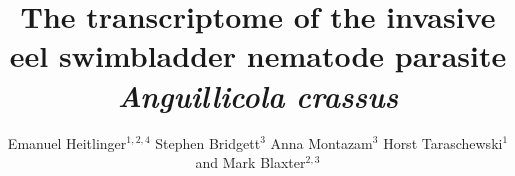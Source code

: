 \documentclass[10pt]{bmc_article}
\newenvironment{bmcformat}{\begin{raggedright}\baselineskip20pt\sloppy\setboolean{publ}{false}}{\end{raggedright}\baselineskip20pt\sloppy}
\begin{document}
\begin{bmcformat}


  \title{The transcriptome of the invasive eel swimbladder nematode
    parasite \textit{Anguillicola crassus}}
 


\author{Emanuel Heitlinger\correspondingauthor$^{1,2,4}$%
       Stephen Bridgett$^{3}$%
       Anna Montazam$^{3}$%
       Horst Taraschewski$^1$%
       and Mark Blaxter$^{2,3}$%
     }%
      


      \address{%
        \iid(1)Department of Ecology and Parasitology, Zoological
        Institute, Karlsruhe Institute of Technology,%
        Kornblumenstrasse 13, Karlsruhe, Germany\\
        \iid(2)Institute of Evolutionary Biology, The Ashworth Laboratories, The University of Edinburgh, The King's Buildings, Edinburgh EH9 3JT, UK\\
        \iid(3)The GenePool Genomics Facility, The Ashworth Laboratories, The University of Edinburgh, The King's Buildings, Edinburgh EH9 3JT, UK\\
        \iid(4) present address: Department for Molecular Parasitology, Institute for Biology, Humboldt University Berlin, Philippstrasse 13, Haus 14, Berlin, Germany
      }%


\end{bmcformat}
\end{document}
